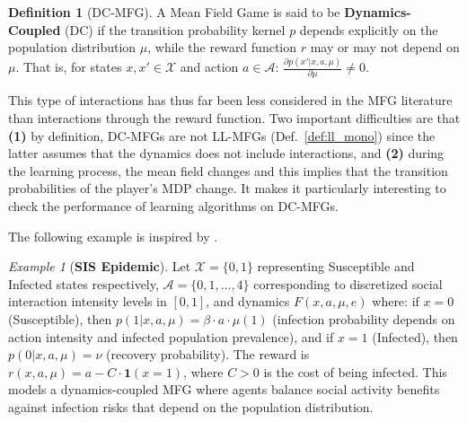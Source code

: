 \documentclass[10pt,twocolumn,letterpaper]{article}
\theoremstyle{definition}
\newtheorem{definition}[theorem]{Definition}
\theoremstyle{remark}
\newtheorem{example}{Example}
\newcommand{\states}{\mathcal{X}}
\newcommand{\actions}{\mathcal{A}}
\begin{document}
\begin{mdframed}[
    linewidth=0pt,        %
    roundcorner=5pt,        %
    backgroundcolor=blue!5, 
    innertopmargin=2pt, 
    innerbottommargin=2pt
]
\begin{definition}[DC-MFG]\label{def: dc-mfg}
    A Mean Field Game is said to be \textbf{Dynamics-Coupled} (DC) if the transition probability kernel $p$ depends explicitly on the population distribution $\mu$, while the reward function $r$ may or may not depend on $\mu$. That is, for states $x, x' \in \states$ and action $a \in \actions$:
    \(
        \frac{\partial p(x'|x, a, \mu)}{\partial \mu} \neq 0.
    \)
\end{definition}
\end{mdframed}
This type of interactions has thus far been less considered in the MFG literature than interactions through the reward function. Two important difficulties are that {\bf (1)} by definition, DC-MFGs are not LL-MFGs (Def.~\ref{def:ll_mono}) since the latter assumes that the dynamics does not include interactions, and {\bf (2)} during the learning process, the mean field changes and this implies that the transition probabilities of the player's MDP change. It makes it particularly interesting to check the performance of learning algorithms on DC-MFGs. 

The following example is inspired by \citep{cui2021approximately}.
\begin{example}[\textbf{SIS Epidemic}]
    \label{ex:dc1}
    Let $\states = \{0, 1\}$ representing Susceptible and Infected states respectively, $\actions = \{0, 1, \ldots, 4\}$ corresponding to discretized social interaction intensity levels in $[0, 1]$, and dynamics $F(x, a, \mu, e)$ where: if $x = 0$ (Susceptible), then $p(1|x, a, \mu) = \beta \cdot a \cdot \mu(1)$ (infection probability depends on action intensity and infected population prevalence), and if $x = 1$ (Infected), then $p(0|x, a, \mu) = \nu$ (recovery probability). The reward is $r(x, a, \mu) = a - C \cdot \mathbf{1}(x = 1)$, where $C > 0$ is the cost of being infected. This models a dynamics-coupled MFG where agents balance social activity benefits against infection risks that depend on the population distribution.
\end{example}
\end{document}
